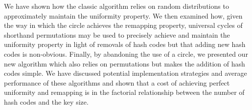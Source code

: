 \documentclass[runningheads,a4paper]{llncs}
\begin{document}
We have shown how the classic algorithm relies on random distributions
to approximately maintain the uniformity property. We then examined
how, given the way in which the circle achieves the remapping
property, universal cycles of shorthand permutations may be used to
precisely achieve and maintain the uniformity property in light of
removals of hash codes but that adding new hash codes is
non-obvious. Finally, by abandoning the use of a circle, we presented
our new algorithm which also relies on permutations but makes the
addition of hash codes simple. We have discussed potential
implementation strategies and average performance of these algorithms
and shown that a cost of achieving perfect uniformity and remapping is
in the factorial relationship between the number of hash codes and the
key size.



\end{document}
